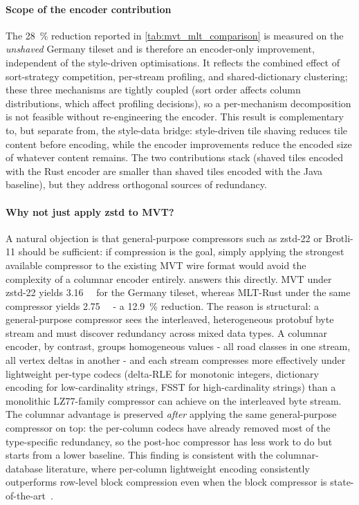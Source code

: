 \paragraph{Scope of the encoder contribution}
The \qty{28}{\percent} reduction reported in \cref{tab:mvt_mlt_comparison} is measured on the \emph{unshaved} Germany tileset and is therefore an encoder-only improvement, independent of the style-driven optimisations.
It reflects the combined effect of sort-strategy competition, per-stream profiling, and shared-dictionary clustering; these three mechanisms are tightly coupled (sort order affects column distributions, which affect profiling decisions), so a per-mechanism decomposition is not feasible without re-engineering the encoder.
This result is complementary to, but separate from, the style-data bridge: style-driven tile shaving reduces tile content before encoding, while the encoder improvements reduce the encoded size of whatever content remains.
The two contributions stack (shaved tiles encoded with the Rust encoder are smaller than shaved tiles encoded with the Java baseline), but they address orthogonal sources of redundancy.

\paragraph{Why not just apply zstd to MVT?}
A natural objection is that general-purpose compressors such as zstd-22 or Brotli-11 should be sufficient: if compression is the goal, simply applying the strongest available compressor to the existing \ac{MVT} wire format would avoid the complexity of a columnar encoder entirely.
 answers this directly.
\ac{MVT} under zstd-22 yields \qty{3.16}{\giga\byte} for the Germany tileset, whereas \ac{MLT}-Rust under the same compressor yields \qty{2.75}{\giga\byte} - a \qty{12.9}{\percent} reduction.
The reason is structural: a general-purpose compressor sees the interleaved, heterogeneous protobuf byte stream and must discover redundancy across mixed data types.
A columnar encoder, by contrast, groups homogeneous values - all road classes in one stream, all vertex deltas in another - and each stream compresses more effectively under lightweight per-type codecs (delta-\acs{RLE} for monotonic integers, dictionary encoding for low-cardinality strings, \ac{FSST} for high-cardinality strings) than a monolithic LZ77-family compressor can achieve on the interleaved byte stream.
The columnar advantage is preserved \emph{after} applying the same general-purpose compressor on top: the per-column codecs have already removed most of the type-specific redundancy, so the post-hoc compressor has less work to do but starts from a lower baseline.
This finding is consistent with the columnar-database literature, where per-column lightweight encoding consistently outperforms row-level block compression even when the block compressor is state-of-the-art~\cite{kuschewskiBtrBlocksEfficientColumnar2023}.

